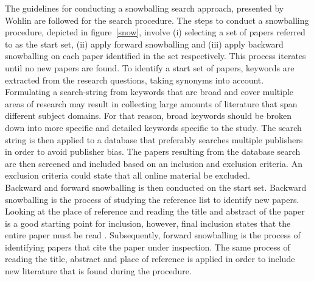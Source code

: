 The guidelines for conducting a snowballing search approach, presented by Wohlin \cite{Wohlin} are followed for the search procedure. The steps to conduct a snowballing procedure, depicted in figure~\ref{snow}, involve (i) selecting a set of papers referred to as the start set, (ii) apply forward snowballing and (iii) apply backward snowballing on each paper identified in the set respectively. This process iterates until no new papers are found. To identify a start set of papers, keywords are extracted from the research questions, taking synonyms into account. Formulating a search-string from keywords that are broad and cover multiple areas of research may result in collecting large amounts of literature that span different subject domains. For that reason, broad keywords should be broken down into more specific and detailed keywords specific to the study. The search string is then applied to a database that preferably searches multiple publishers in order to avoid publisher bias. The papers resulting from the database search are then screened and included based on an inclusion and exclusion criteria. An exclusion criteria could state that all online material be excluded. \\


Backward and forward snowballing is then conducted on the start set. Backward snowballing is the process of studying the reference list to identify new papers. Looking at the place of reference and reading the title and abstract of the paper is a good starting point for inclusion, however, final inclusion states that the entire paper must be read \cite{Wohlin}. Subsequently, forward snowballing is the process of identifying papers that cite the paper under inspection. The same process of reading the title, abstract and place of reference is applied in order to include new literature that is found during the procedure. \\


